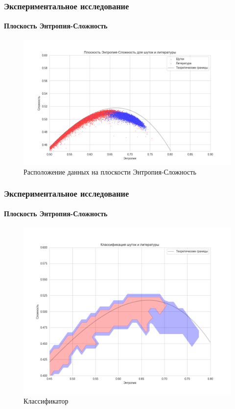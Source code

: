 \documentclass[aspectratio=169]{beamer}
\begin{document}
\begin{frame}
\frametitle{Экспериментальное исследование}
\framesubtitle{Плоскость Энтропия-Сложность}
	
	\begin{figure}[htbp]
            \centering
            \includegraphics[scale=0.4]{image1}
            \caption{Расположение данных на плоскости Энтропия-Сложность}
            \label{fig:image1}
        \end{figure}

\end{frame}

\begin{frame}
\frametitle{Экспериментальное исследование}
\framesubtitle{Плоскость Энтропия-Сложность}
	
	\begin{figure}[htbp]
            \centering
            \includegraphics[scale=0.3]{image6}
            \caption{Классификатор}
            \label{fig:image6}
        \end{figure}

\end{frame}
\end{document}
